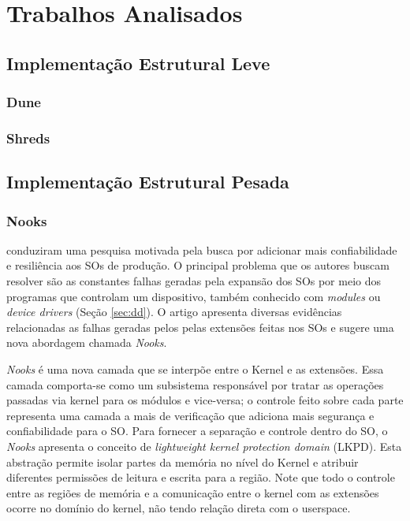 \chapter{Trabalhos Analisados}
\label{cap:trabalhos-analisados}

\section{Implementação Estrutural Leve}

\subsection{Dune}

\subsection{Shreds}

\section{Implementação Estrutural Pesada}

\subsection{Nooks}
\cite{nooks} conduziram uma pesquisa motivada pela busca por
adicionar mais confiabilidade e resiliência aos SOs de produção. O principal
problema que os autores buscam resolver são as constantes falhas geradas pela
expansão dos SOs por meio dos programas que controlam um dispositivo, também
conhecido com \emph{modules} ou \emph{device drivers} (Seção \ref{sec:dd}). O
artigo apresenta diversas evidências relacionadas as falhas geradas pelos
pelas extensões feitas nos SOs e sugere uma nova abordagem chamada
\emph{Nooks}.

\emph{Nooks} é uma nova camada que se interpõe entre o Kernel e as extensões.
Essa camada comporta-se como um subsistema responsável por tratar as operações
passadas via kernel para os módulos e vice-versa; o controle feito sobre cada
parte representa uma camada a mais de verificação que adiciona mais segurança e
confiabilidade para o SO. Para fornecer a separação e controle dentro do SO, o
\emph{Nooks} apresenta o conceito de \emph{lightweight kernel protection
domain} (LKPD). Esta abstração permite isolar partes da memória no nível do
Kernel e
atribuir diferentes permissões de leitura e escrita para a região. Note que
todo o controle entre as regiões de memória e a comunicação entre o kernel com
as extensões ocorre no domínio do kernel, não tendo relação direta com o
userspace.


